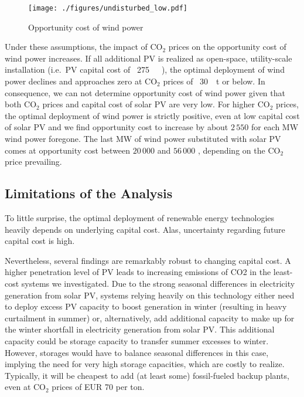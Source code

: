 \documentclass[review, 3p, times]{elsarticle} %
\newcommand{\COO}{\ensuremath{\mathrm{CO_2}} }
\begin{document}
    \begin{figure*}[h!t]
        \centering
        \texttt{[image: ./figures/undisturbed\_low.pdf]}
        \caption{Opportunity cost of wind power}
    \end{figure*}

    Under these assumptions, the impact of \COO prices on the opportunity cost of wind power increases.
    If all additional PV is realized as open-space, utility-scale installation (i.e.\ PV capital cost of
    \EUR~\SI{275}{\per\kilo\wattpeak}), the optimal deployment of wind power declines and approaches zero at \COO prices
    of \EUR~\SI{30}{\per\tonne} or below.
    In consequence, we can not determine opportunity cost of wind power given that both \COO prices and capital cost of
    solar PV are very low.
    For higher \COO prices, the optimal deployment of wind power is strictly positive, even at low capital cost of solar
    PV and we find opportunity cost to increase by about $2\,550$ \EUR for each MW wind power foregone.
    The last MW of wind power substituted with solar PV comes at opportunity cost between $20\,000$ and $56\,000$ \EUR,
    depending on the \COO price prevailing.

    \subsection{Limitations of the Analysis}
    To little surprise, the optimal deployment of renewable energy technologies heavily depends on underlying capital
    cost.
    Alas, uncertainty regarding future capital cost is high.

    Nevertheless, several findings are remarkably robust to changing capital cost.
    A higher penetration level of PV leads to increasing emissions of CO2 in the least-cost systems we investigated.
    Due to the strong seasonal differences in electricity generation from solar PV, systems relying heavily on this technology either need to deploy excess PV capacity to boost generation in winter (resulting in heavy curtailment in summer) or, alternatively, add additional capacity to make up for the winter shortfall in electricity generation from solar PV.
    This additional capacity could be storage capacity to transfer summer excesses to winter.
    However, storages would have to balance seasonal differences in this case, implying the need for very high storage capacities, which are costly to realize.
    Typically, it will be cheapest to add (at least some) fossil-fueled backup plants, even at \COO prices of EUR 70 per ton.
\end{document}
